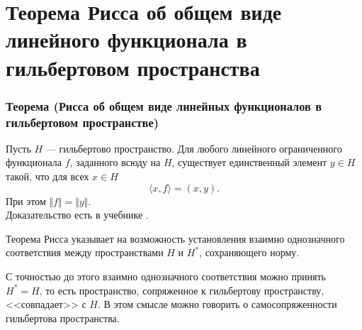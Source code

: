 \section{Теорема Рисса об общем виде линейного функционала в гильбертовом пространства}
\label{sec:q-26}
\subsubsection*{Теорема (Рисса об общем виде линейных функционалов в гильбертовом пространстве)}
Пусть $H$ --- гильбертово пространство. Для любого линейного ограниченного функционала $f$, заданного всюду на $H$, существует единственный элемент $y \in H$ такой, что для всех $x \in H$
$$\langle x, f \rangle = (x, y).$$
При этом $\Vert f \Vert = \Vert y \Vert$.\\
Доказательство есть в учебнике \cite[с.~171]{trenogin}.

Теорема Рисса указывает на возможность установления взаимно однозначного соответствия между пространствами $H$ и $H^*$, сохраняющего норму.

С точностью до этого взаимно однозначного соответствия можно принять $H^* = H$, то есть пространство, сопряженное к гильбертову пространству, <<совпадает>> с $H$. В этом смысле можно говорить о самосопряженности гильбертова пространства.